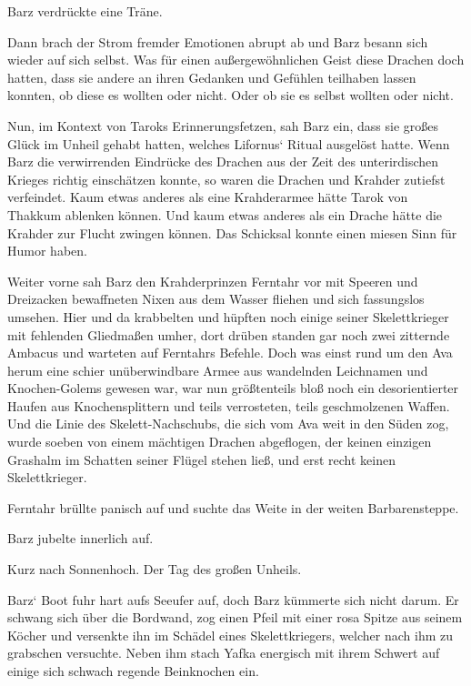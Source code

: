 Barz verdrückte eine Träne.

Dann brach der Strom fremder Emotionen abrupt ab und Barz besann sich wieder auf sich selbst. Was für einen außergewöhnlichen Geist diese Drachen doch hatten, dass sie andere an ihren Gedanken und Gefühlen teilhaben lassen konnten, ob diese es wollten oder nicht. Oder ob sie es selbst wollten oder nicht.

Nun, im Kontext von Taroks Erinnerungsfetzen, sah Barz ein, dass sie großes Glück im Unheil gehabt hatten, welches Lifornus‘ Ritual ausgelöst hatte. Wenn Barz die verwirrenden Eindrücke des Drachen aus der Zeit des unterirdischen Krieges richtig einschätzen konnte, so waren die Drachen und Krahder zutiefst verfeindet. Kaum etwas anderes als eine Krahderarmee hätte Tarok von Thakkum ablenken können. Und kaum etwas anderes als ein Drache hätte die Krahder zur Flucht zwingen können. Das Schicksal konnte einen miesen Sinn für Humor haben.

Weiter vorne sah Barz den Krahderprinzen Ferntahr vor mit Speeren und Dreizacken bewaffneten Nixen aus dem Wasser fliehen und sich fassungslos umsehen. Hier und da krabbelten und hüpften noch einige seiner Skelettkrieger mit fehlenden Gliedmaßen umher, dort drüben standen gar noch zwei zitternde Ambacus und warteten auf Ferntahrs Befehle. Doch was einst rund um den Ava herum eine schier unüberwindbare Armee aus wandelnden Leichnamen und Knochen-Golems gewesen war, war nun größtenteils bloß noch ein desorientierter Haufen aus Knochensplittern und teils verrosteten, teils geschmolzenen Waffen. Und die Linie des Skelett-Nachschubs, die sich vom Ava weit in den Süden zog, wurde soeben von einem mächtigen Drachen abgeflogen, der keinen einzigen Grashalm im Schatten seiner Flügel stehen ließ, und erst recht keinen Skelettkrieger.

Ferntahr brüllte panisch auf und suchte das Weite in der weiten Barbarensteppe.

Barz jubelte innerlich auf.



\trennzeichen



Kurz nach Sonnenhoch. Der Tag des großen Unheils.\bigskip



Barz‘ Boot fuhr hart aufs Seeufer auf, doch Barz kümmerte sich nicht darum. Er schwang sich über die Bordwand, zog einen Pfeil mit einer rosa Spitze aus seinem Köcher und versenkte ihn im Schädel eines Skelettkriegers, welcher nach ihm zu grabschen versuchte. Neben ihm stach Yafka energisch mit ihrem Schwert auf einige sich schwach regende Beinknochen ein.

